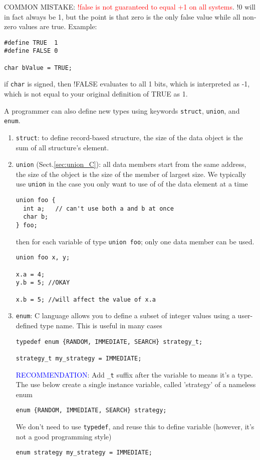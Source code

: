 \begin{mdframed}
COMMON MISTAKE: \textcolor{red}{!false is not guaranteed to equal +1 on all
systems}. !0 will in fact always be 1, but the point is that zero is the only
false value while all non-zero values are true. Example:
\begin{lstlisting}
#define TRUE  1
#define FALSE 0

char bValue = TRUE;
\end{lstlisting}
if \verb!char! is signed, then !FALSE evaluates to all 1 bits, which is
interpreted as -1, which is not equal to your original definition of TRUE as 1.
\end{mdframed}

A programmer can also define new types using keywords \verb!struct!,
\verb!union!, and \verb!enum!.
\begin{enumerate}
  \item \verb!struct!: to define record-based structure, the size of the data
  object is the sum of all structure's element.
  
  \item \verb!union! (Sect.\ref{sec:union_C}): all data members start from the
  same address, the size of the object is the size of the member of largest
  size. We typically use \verb!union! in the case you only want to use of of the
  data element at a time
  \begin{lstlisting}
union foo {
  int a;   // can't use both a and b at once
  char b;
} foo;
  \end{lstlisting} 
then for each variable of type \verb!union foo!; only one data member can be
used.
\begin{verbatim}
union foo x, y;

x.a = 4;
y.b = 5; //OKAY

x.b = 5; //will affect the value of x.a
\end{verbatim}
    
  \item \verb!enum!: C language allows you to define a subset of integer values
  using a user-defined type name. This is useful in many cases
\begin{lstlisting}
typedef enum {RANDOM, IMMEDIATE, SEARCH} strategy_t;

strategy_t my_strategy = IMMEDIATE;
\end{lstlisting}
\textcolor{blue}{RECOMMENDATION}: Add \verb!_t! suffix after the variable to
means it's a type. The use below create a single instance variable, called
'strategy' of a nameless enum
\begin{lstlisting}
enum {RANDOM, IMMEDIATE, SEARCH} strategy;
\end{lstlisting}
We don't need to use \verb!typedef!, and reuse this to define
variable (however, it's not a good programming style)
\begin{lstlisting}
enum strategy my_strategy = IMMEDIATE;
\end{lstlisting}

  
\end{enumerate}


